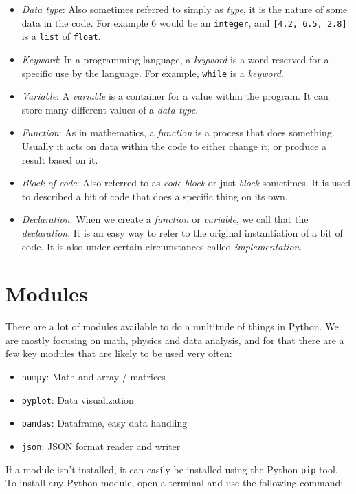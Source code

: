 \documentclass[twocolumn]{article}
\begin{document}
\begin{itemize}
    \item \emph{Data type}: Also sometimes referred to simply as \emph{type}, it is the nature of some data in the code. For example $6$ would be an \verb|integer|, and \verb|[4.2, 6.5, 2.8]| is a \verb|list| of \verb|float|.
    \item \emph{Keyword}: In a programming language, a \emph{keyword} is a word reserved for a specific use by the language. For example, \verb|while| is a \emph{keyword}.
    \item \emph{Variable}: A \emph{variable} is a container for a value within the program. It can store many different values of a \emph{data type}.
    \item \emph{Function}: As in mathematics, a \emph{function} is a process that does something. Usually it acts on data within the code to either change it, or produce a result based on it.
    \item \emph{Block of code}: Also referred to as \emph{code block} or just \emph{block} sometimes. It is used to described a bit of code that does a specific thing on its own.
    \item \emph{Declaration}: When we create a \emph{function} or \emph{variable}, we call that the \emph{declaration}. It is an easy way to refer to the original instantiation of a bit of code. It is also under certain circumstances called \emph{implementation}.
\end{itemize}

\section{Modules}\label{app:modules}

There are a lot of modules available to do a multitude of things in Python. We are mostly focusing on math, physics and data analysis, and for that there are a few key modules that are likely to be used very often:

\begin{itemize}
    \item \verb|numpy|: Math and array / matrices
    \item \verb|pyplot|: Data visualization
    \item \verb|pandas|: Dataframe, easy data handling
    \item \verb|json|: JSON format reader and writer
\end{itemize}

If a module isn't installed, it can easily be installed using the Python \verb|pip| tool. To install any Python module, open a terminal and use the following command:
\end{document}
